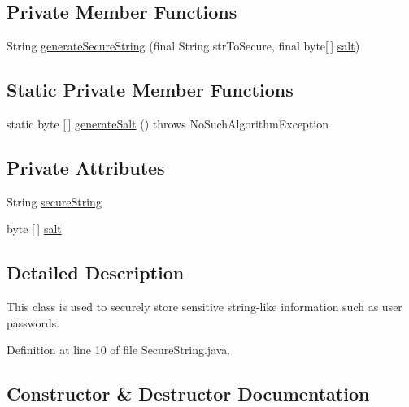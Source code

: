 \subsection*{Private Member Functions}
\begin{DoxyCompactItemize}
\item 
String \mbox{\hyperlink{classcom_1_1activitytracker_1_1_secure_string_aa2521591ab15fb4c5a2461c04b08320f}{generate\+Secure\+String}} (final String str\+To\+Secure, final byte\mbox{[}$\,$\mbox{]} \mbox{\hyperlink{classcom_1_1activitytracker_1_1_secure_string_a8549ead1f186ff0c2520818b03d1cc21}{salt}})
\end{DoxyCompactItemize}
\subsection*{Static Private Member Functions}
\begin{DoxyCompactItemize}
\item 
static byte \mbox{[}$\,$\mbox{]} \mbox{\hyperlink{classcom_1_1activitytracker_1_1_secure_string_a1907ad109bb5e64291fabd3ff459ef49}{generate\+Salt}} ()  throws No\+Such\+Algorithm\+Exception 
\end{DoxyCompactItemize}
\subsection*{Private Attributes}
\begin{DoxyCompactItemize}
\item 
String \mbox{\hyperlink{classcom_1_1activitytracker_1_1_secure_string_a1448f7b8865c6c57cc7218662ee7f1ee}{secure\+String}}
\item 
byte \mbox{[}$\,$\mbox{]} \mbox{\hyperlink{classcom_1_1activitytracker_1_1_secure_string_a8549ead1f186ff0c2520818b03d1cc21}{salt}}
\end{DoxyCompactItemize}


\subsection{Detailed Description}
This class is used to securely store sensitive string-\/like information such as user passwords. 

Definition at line 10 of file Secure\+String.\+java.



\subsection{Constructor \& Destructor Documentation}
\mbox{\label{classcom_1_1activitytracker_1_1_secure_string_a889fcbf0c1f771962ac81886f49e389e}} 
